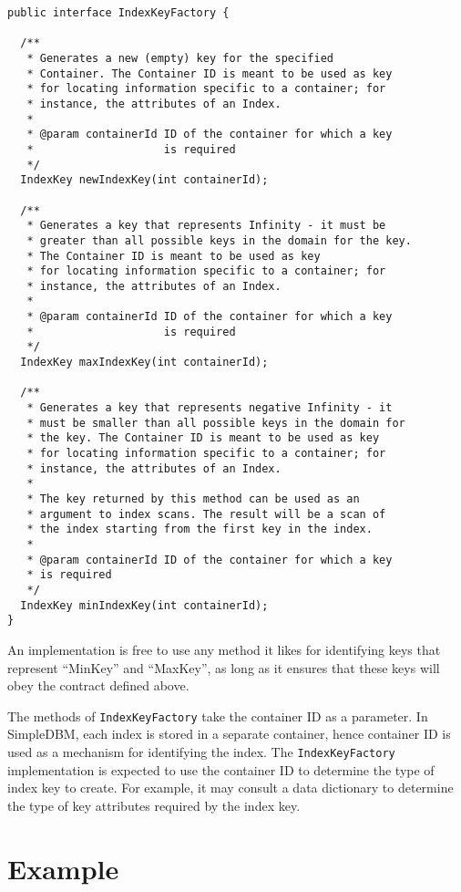 \documentclass[a4paper,draft,oneside]{book}
\begin{document}
\begin{verbatim}
public interface IndexKeyFactory {

  /**
   * Generates a new (empty) key for the specified
   * Container. The Container ID is meant to be used as key
   * for locating information specific to a container; for 
   * instance, the attributes of an Index.
   * 
   * @param containerId ID of the container for which a key 
   *                    is required
   */
  IndexKey newIndexKey(int containerId);

  /**
   * Generates a key that represents Infinity - it must be 
   * greater than all possible keys in the domain for the key. 
   * The Container ID is meant to be used as key
   * for locating information specific to a container; for 
   * instance, the attributes of an Index.
   * 
   * @param containerId ID of the container for which a key 
   *                    is required
   */
  IndexKey maxIndexKey(int containerId);
	
  /**
   * Generates a key that represents negative Infinity - it 
   * must be smaller than all possible keys in the domain for 
   * the key. The Container ID is meant to be used as key
   * for locating information specific to a container; for 
   * instance, the attributes of an Index.
   *
   * The key returned by this method can be used as an
   * argument to index scans. The result will be a scan of 
   * the index starting from the first key in the index.
   * 
   * @param containerId ID of the container for which a key 
   * is required
   */
  IndexKey minIndexKey(int containerId);
}
\end{verbatim}

An implementation is free to use any method it likes for identifying
keys that represent ``MinKey'' and ``MaxKey'', as long as it ensures
that these keys will obey the contract defined above.

The methods of \verb|IndexKeyFactory| take the container ID as a
parameter. In SimpleDBM, each index is stored in a separate container,
hence container ID is used as a mechanism for identifying the index.
The \verb|IndexKeyFactory| implementation is expected to use the
container ID to determine the type of index key to create. For
example, it may consult a data dictionary to determine the type of key
attributes required by the index key.

\section{Example}
\end{document}
